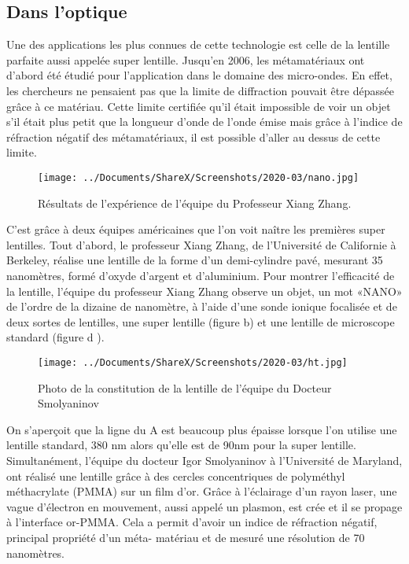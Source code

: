 \documentclass[12pt,a4paper]{article}
\begin{document}
	\subsection{Dans l'optique}
	Une des applications les plus connues de cette technologie est celle de la lentille parfaite aussi appelée super lentille. Jusqu’en 2006, les métamatériaux ont d’abord été étudié pour l’application dans le domaine des micro-ondes. En effet, les chercheurs ne pensaient pas que la limite de diffraction pouvait être dépassée grâce à ce matériau. Cette limite certifiée qu’il était impossible de voir un objet s’il était plus petit que la longueur d’onde de l’onde émise mais grâce à l’indice de réfraction négatif des métamatériaux, il est possible d’aller au dessus de cette limite.\newpage
\begin{wrapfigure}{l}{0.5\textwidth}\centering
	\texttt{[image: ../Documents/ShareX/Screenshots/2020-03/nano.jpg]}
	\caption{Résultats de l'expérience de l'équipe du Professeur Xiang Zhang.}
\end{wrapfigure}
C’est grâce à deux équipes américaines que l’on voit naître les premières super lentilles. Tout d’abord, le professeur Xiang Zhang, de l’Université de Californie à Berkeley, réalise une lentille de la forme d’un demi-cylindre pavé, mesurant 35 nanomètres, formé d’oxyde d’argent et d’aluminium. Pour montrer l’efficacité de la lentille, l’équipe du professeur Xiang Zhang observe un objet, un mot «NANO» de l’ordre de la dizaine de nanomètre,  à l’aide d’une sonde ionique focalisée et de deux sortes de lentilles, une super lentille (figure b) et une lentille de microscope standard (figure d ). \\
\begin{wrapfigure}{r}{5cm}
  \centering
\texttt{[image: ../Documents/ShareX/Screenshots/2020-03/ht.jpg]}
\caption{Photo de la constitution de la lentille de l'équipe du Docteur Smolyaninov}
\end{wrapfigure}

	On s’aperçoit que la ligne du A est beaucoup plus épaisse lorsque l’on utilise une lentille standard, 380 nm alors qu’elle est de 90nm pour la super lentille. Simultanément, l’équipe du docteur Igor Smolyaninov à l’Université de Maryland, ont réalisé une lentille grâce à des cercles concentriques de polyméthyl méthacrylate (PMMA) sur un film d’or. Grâce à l’éclairage d’un rayon laser, une vague d’électron en mouvement, aussi appelé un plasmon, est crée et il se propage à l’interface or-PMMA. Cela a permit d’avoir un indice de réfraction négatif, principal propriété d’un méta- matériau et de mesuré une résolution de 70 nanomètres. \cite{Goudet2007}  \\ 
\end{document}
